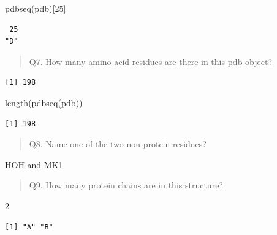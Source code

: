 \documentclass[
  letterpaper,
  DIV=11,
  numbers=noendperiod]{scrartcl}
\newenvironment{Shaded}{\begin{snugshade}}{\end{snugshade}}
\newcommand{\DecValTok}[1]{\textcolor[rgb]{0.68,0.00,0.00}{#1}}
\newcommand{\FunctionTok}[1]{\textcolor[rgb]{0.28,0.35,0.67}{#1}}
\newcommand{\NormalTok}[1]{\textcolor[rgb]{0.00,0.23,0.31}{#1}}
\newcommand{\SpecialCharTok}[1]{\textcolor[rgb]{0.37,0.37,0.37}{#1}}
\begin{document}
\begin{Shaded}
\begin{Highlighting}[]
\FunctionTok{pdbseq}\NormalTok{(pdb)[}\DecValTok{25}\NormalTok{]}
\end{Highlighting}
\end{Shaded}

\begin{verbatim}
 25 
"D" 
\end{verbatim}

\begin{quote}
Q7. How many amino acid residues are there in this pdb object?
\end{quote}

\begin{Shaded}
\end{Shaded}

\begin{verbatim}
[1] 198
\end{verbatim}

\begin{Shaded}
\begin{Highlighting}[]
\FunctionTok{length}\NormalTok{(}\FunctionTok{pdbseq}\NormalTok{(pdb))}
\end{Highlighting}
\end{Shaded}

\begin{verbatim}
[1] 198
\end{verbatim}

\begin{quote}
Q8. Name one of the two non-protein residues?
\end{quote}

HOH and MK1

\begin{quote}
Q9. How many protein chains are in this structure?
\end{quote}

2

\begin{Shaded}
\end{Shaded}

\begin{verbatim}
[1] "A" "B"
\end{verbatim}
\end{document}
